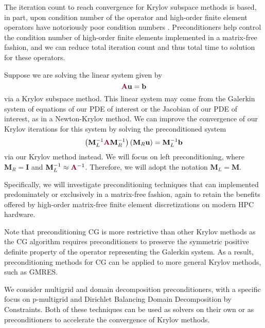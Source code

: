 The iteration count to reach convergence for Krylov subspace methods is based, in part, upon condition number of the operator \cite{luenberger1973introduction} and high-order finite element operators have notoriously poor condition numbers \cite{hu1998bounds}.
Preconditioners help control the condition number of high-order finite elements implemented in a matrix-free fashion, and we can reduce total iteration count and thus total time to solution for these operators.

Suppose we are solving the linear system given by
\begin{equation}
{\color{burgundy}\mathbf{A}} \mathbf{u} = \mathbf{b}
\label{linear_eqn}
\end{equation}
via a Krylov subspace method.
This linear system may come from the Galerkin system of equations of our PDE of interest or the Jacobian of our PDE of interest, as in a Newton-Krylov method.
We can improve the convergence of our Krylov iterations for this system by solving the preconditioned system
\begin{equation}
\left( \mathbf{M}_L^{-1} {\color{burgundy}\mathbf{A}} \mathbf{M}_R^{-1} \right) \left( \mathbf{M}_R \mathbf{u} \right) = \mathbf{M}_L^{-1} \mathbf{b}
\label{precond_eqn}
\end{equation}
via our Krylov method instead.
We will focus on left preconditioning, where $\mathbf{M}_R = \mathbf{I}$ and $\mathbf{M}_L^{-1} \approx {\color{burgundy}\mathbf{A}}^{-1}$.
Therefore, we will adopt the notation $\mathbf{M}_L = \mathbf{M}$.

Specifically, we will investigate preconditioning techniques that can implemented predominately or exclusively in a matrix-free fashion, again to retain the benefits offered by high-order matrix-free finite element discretizations on modern HPC hardware.

Note that preconditioning CG is more restrictive than other Krylov methods as the CG algorithm requires preconditioners to preserve the symmetric positive definite property of the operator representing the Galerkin system.
As a result, preconditioning methods for CG can be applied to more general Krylov methods, such as GMRES.

We consider multigrid and domain decomposition preconditioners, with a specific focus on p-multigrid and Dirichlet Balancing Domain Decomposition by Constraints.
Both of these techniques can be used as solvers on their own or as preconditioners to accelerate the convergence of Krylov methods.
